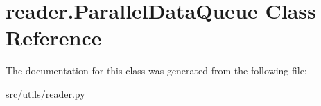 \hypertarget{classreader_1_1ParallelDataQueue}{}\section{reader.\+Parallel\+Data\+Queue Class Reference}
\label{classreader_1_1ParallelDataQueue}


The documentation for this class was generated from the following file\+:\begin{DoxyCompactItemize}
\item 
src/utils/reader.\+py\end{DoxyCompactItemize}

